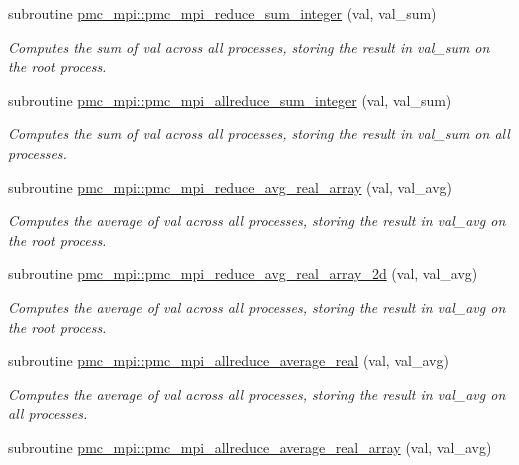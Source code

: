 \begin{DoxyCompactItemize}
subroutine \mbox{\hyperlink{namespacepmc__mpi_ab78b8cedd338fe1f9e39a7a3b6ebee7c}{pmc\+\_\+mpi\+::pmc\+\_\+mpi\+\_\+reduce\+\_\+sum\+\_\+integer}} (val, val\+\_\+sum)
\begin{DoxyCompactList}\small\item\em Computes the sum of {\ttfamily val} across all processes, storing the result in {\ttfamily val\+\_\+sum} on the root process. \end{DoxyCompactList}\item 
subroutine \mbox{\hyperlink{namespacepmc__mpi_ac35b8fc7f2c6fffbd92b4e655f31855c}{pmc\+\_\+mpi\+::pmc\+\_\+mpi\+\_\+allreduce\+\_\+sum\+\_\+integer}} (val, val\+\_\+sum)
\begin{DoxyCompactList}\small\item\em Computes the sum of {\ttfamily val} across all processes, storing the result in {\ttfamily val\+\_\+sum} on all processes. \end{DoxyCompactList}\item 
subroutine \mbox{\hyperlink{namespacepmc__mpi_a65e8bc531122712336e66a245ee62665}{pmc\+\_\+mpi\+::pmc\+\_\+mpi\+\_\+reduce\+\_\+avg\+\_\+real\+\_\+array}} (val, val\+\_\+avg)
\begin{DoxyCompactList}\small\item\em Computes the average of val across all processes, storing the result in val\+\_\+avg on the root process. \end{DoxyCompactList}\item 
subroutine \mbox{\hyperlink{namespacepmc__mpi_aaf6103345beb31b7d1a7dfa8c4f6e9a3}{pmc\+\_\+mpi\+::pmc\+\_\+mpi\+\_\+reduce\+\_\+avg\+\_\+real\+\_\+array\+\_\+2d}} (val, val\+\_\+avg)
\begin{DoxyCompactList}\small\item\em Computes the average of val across all processes, storing the result in val\+\_\+avg on the root process. \end{DoxyCompactList}\item 
subroutine \mbox{\hyperlink{namespacepmc__mpi_af48bdae1028cee45478e96081514009c}{pmc\+\_\+mpi\+::pmc\+\_\+mpi\+\_\+allreduce\+\_\+average\+\_\+real}} (val, val\+\_\+avg)
\begin{DoxyCompactList}\small\item\em Computes the average of val across all processes, storing the result in val\+\_\+avg on all processes. \end{DoxyCompactList}\item 
subroutine \mbox{\hyperlink{namespacepmc__mpi_aa8adfc668b04490ada770354659fdc4c}{pmc\+\_\+mpi\+::pmc\+\_\+mpi\+\_\+allreduce\+\_\+average\+\_\+real\+\_\+array}} (val, val\+\_\+avg)

\end{DoxyCompactItemize}

